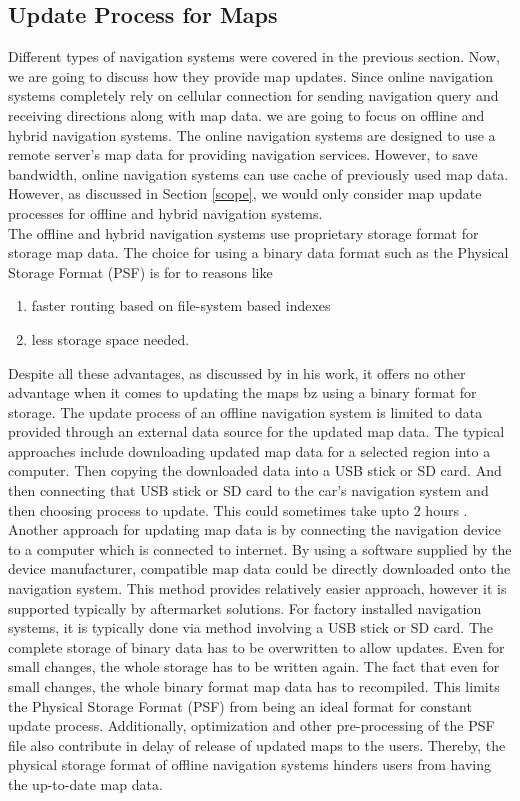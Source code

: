 \subsection{Update Process for Maps} \label{existingUpdate}
Different types of navigation systems were covered in the previous section. Now, we are going to discuss how they provide map updates. Since online navigation systems completely rely on cellular connection for sending navigation query and receiving directions along with map data. we are going to focus on offline and hybrid navigation systems. The online navigation systems are designed to use a remote server's map data for providing navigation services. However, to save bandwidth, online navigation systems can use cache of previously used map data. However, as discussed in Section \ref{scope}, we would only consider map update processes for offline and hybrid navigation systems. \\

The offline and hybrid navigation systems use proprietary storage format for storage map data. The choice for using a binary data format such as the Physical Storage Format (PSF) is for to reasons like
\begin{enumerate}
\item faster routing based on file-system based indexes
\item less storage space needed.
\end{enumerate}
Despite all these advantages, as discussed by \citet{min2008mobile} in his work, it offers no other advantage when it comes to updating the maps bz using a binary format for storage. The update process of an offline navigation system is limited to data provided through an external data source for the updated map data. The typical approaches include downloading updated map data for a selected region into a computer. Then copying the downloaded data into a USB stick or SD card. And then connecting that USB stick or SD card to the car's navigation system and then choosing process to update. This could sometimes take upto 2 hours \cite{garminupdate}. Another approach for updating map data is by connecting the navigation device to a computer which is connected to internet. By using a software supplied by the device manufacturer, compatible map data could be directly downloaded onto the navigation system. This method provides relatively easier approach, however it is supported typically by aftermarket solutions. For factory installed navigation systems, it is typically done via method involving a USB stick or SD card. The complete storage of binary data has to be overwritten to allow updates. Even for small changes, the whole storage has to be written again. The fact that even for small changes, the whole binary format map data has to recompiled. This limits the Physical Storage Format (PSF) from being an ideal format for constant update process. Additionally, optimization and other pre-processing of the PSF file also contribute in delay of release of updated maps to the users. Thereby, the physical storage format of offline navigation systems hinders users from having the up-to-date map data. 
\\

